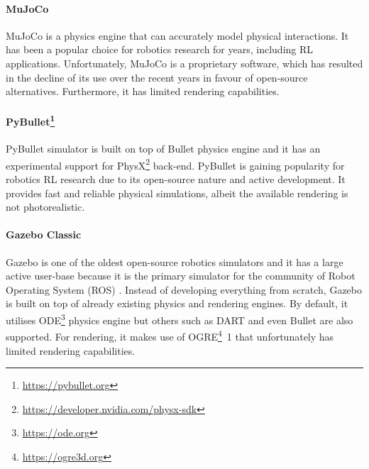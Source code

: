 \newpage

\paragraph{MuJoCo~\protect\cite{todorov_mujoco_2012}} MuJoCo is a physics engine that can accurately model physical interactions. It has been a popular choice for robotics research for years, including RL applications. Unfortunately, MuJoCo is a proprietary software, which has resulted in the decline of its use over the recent years in favour of open-source alternatives. Furthermore, it has limited rendering capabilities.

\paragraph{PyBullet\protect\footnote{\href{https://pybullet.org}{https://pybullet.org}}} PyBullet simulator is built on top of Bullet physics engine and it has an experimental support for PhysX\footnote{\href{https://developer.nvidia.com/physx-sdk}{https://developer.nvidia.com/physx-sdk}} back-end. PyBullet is gaining popularity for robotics RL research due to its open-source nature and active development. It provides fast and reliable physical simulations, albeit the available rendering is not photorealistic.

\paragraph{Gazebo Classic~\protect\cite{koenig_design_2004}} Gazebo is one of the oldest open-source robotics simulators and it has a large active user-base because it is the primary simulator for the community of Robot Operating System (ROS) \cite{quigley_ros_2009}. Instead of developing everything from scratch, Gazebo is built on top of already existing physics and rendering engines. By default, it utilises ODE\footnote{\href{https://ode.org}{https://ode.org}} physics engine but others such as DART \cite{lee_dart_2018} and even Bullet are also supported. For rendering, it makes use of OGRE\footnote{\href{https://ogre3d.org}{https://ogre3d.org}}~1 that unfortunately has limited rendering capabilities.

